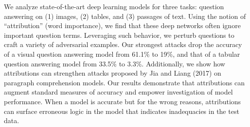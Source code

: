 We analyze state-of-the-art deep learning models for three tasks: question answering on (1) images, (2) tables, and (3) passages of text. Using the notion of ``attribution'' (word importance), we find that these deep networks often ignore important question terms. Leveraging such behavior, we perturb questions to craft a variety of adversarial examples. Our strongest attacks drop the accuracy of a visual question answering model from 61.1\% to 19\%, and that of a tabular question answering model from 33.5\% to 3.3\%. Additionally, we show how attributions can strengthen attacks proposed by Jia and Liang (2017) on paragraph comprehension models. Our results demonstrate that attributions can augment standard measures of accuracy and empower investigation of model performance. When a model is accurate but for the wrong reasons, attributions can surface erroneous logic in the model that indicates inadequacies in the test data.
